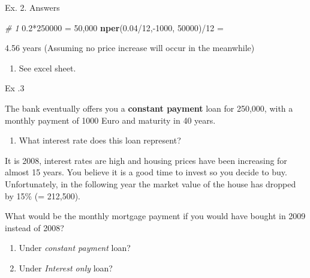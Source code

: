 \documentclass[ignorenonframetext,]{beamer}
\newenvironment{Shaded}{\begin{snugshade}}{\end{snugshade}}
\newcommand{\KeywordTok}[1]{\textcolor[rgb]{0.13,0.29,0.53}{\textbf{{#1}}}}
\newcommand{\DecValTok}[1]{\textcolor[rgb]{0.00,0.00,0.81}{{#1}}}
\newcommand{\FloatTok}[1]{\textcolor[rgb]{0.00,0.00,0.81}{{#1}}}
\newcommand{\StringTok}[1]{\textcolor[rgb]{0.31,0.60,0.02}{{#1}}}
\newcommand{\CommentTok}[1]{\textcolor[rgb]{0.56,0.35,0.01}{\textit{{#1}}}}
\newcommand{\NormalTok}[1]{{#1}}
\providecommand{\tightlist}{%
\setlength{\itemsep}{0pt}\setlength{\parskip}{0pt}}
\begin{document}
\begin{frame}[fragile]{Ex. 2. Answers}

\footnotesize

\begin{Shaded}
\begin{Highlighting}[]
\CommentTok{# 1}
\FloatTok{0.2}\NormalTok{*}\DecValTok{250000} \NormalTok{=}\StringTok{ }\DecValTok{50}\NormalTok{,}\DecValTok{000}
\KeywordTok{nper}\NormalTok{(}\FloatTok{0.04}\NormalTok{/}\DecValTok{12}\NormalTok{,-}\DecValTok{1000}\NormalTok{, }\DecValTok{50000}\NormalTok{)/}\DecValTok{12} \NormalTok{=}\StringTok{ }

\FloatTok{4.56} \NormalTok{years }
\NormalTok{(Assuming no price increase will occur in the meanwhile)}
\end{Highlighting}
\end{Shaded}

\normalsize

\begin{enumerate}
\def\labelenumi{\arabic{enumi}.}
\setcounter{enumi}{1}
\tightlist
\item
  See excel sheet.
\end{enumerate}

\end{frame}

\begin{frame}{Ex .3}

The bank eventually offers you a \textbf{constant payment} loan for
250,000, with a monthly payment of 1000 Euro and maturity in 40 years.

\begin{enumerate}
\def\labelenumi{\arabic{enumi}.}
\tightlist
\item
  What interest rate does this loan represent?
\end{enumerate}

It is 2008, interest rates are high and housing prices have been
increasing for almost 15 years. You believe it is a good time to invest
so you decide to buy. Unfortunately, in the following year the market
value of the house has dropped by 15\% (= 212,500).

What would be the monthly mortgage payment if you would have bought in
2009 instead of 2008?

\begin{enumerate}
\def\labelenumi{\arabic{enumi}.}
\setcounter{enumi}{1}
\tightlist
\item
  Under \emph{constant payment} loan?
\item
  Under \emph{Interest only} loan?
\end{enumerate}

\end{frame}
\end{document}
